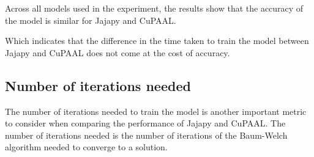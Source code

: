 Across all models used in the experiment, the results show that the accuracy of the model is similar for Jajapy and CuPAAL.

Which indicates that the difference in the time taken to train the model between Jajapy and CuPAAL does not come at the cost of accuracy.


\subsection{Number of iterations needed}\label{subsec:results_iterations}
The number of iterations needed to train the model is another important metric to consider when comparing the performance of Jajapy and CuPAAL.
The number of iterations needed is the number of iterations of the Baum-Welch algorithm needed to converge to a solution.

